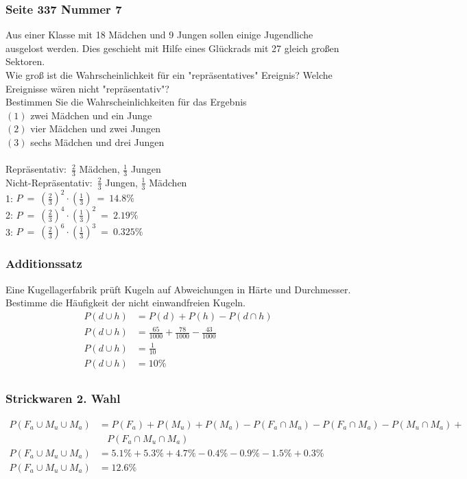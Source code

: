 \documentclass[a4paper,12pt]{article}
\begin{document}
\subsubsection*{Seite 337 Nummer 7}
Aus einer Klasse mit 18 Mädchen und 9 Jungen sollen einige Jugendliche ausgelost werden. Dies geschieht mit Hilfe eines Glückrads mit 27 gleich großen Sektoren.\\
Wie groß ist die Wahrscheinlichkeit für ein "repräsentatives" Ereignis? Welche Ereignisse wären nicht "repräsentativ"?\\
Bestimmen Sie die Wahrscheinlichkeiten für das Ergebnis\\
$(1)$ zwei Mädchen und ein Junge\\
$(2)$ vier Mädchen und zwei Jungen\\
$(3)$ sechs Mädchen und drei Jungen\\\\
Repräsentativ:\ $\frac{2}{3}$ Mädchen, $\frac{1}{3}$ Jungen\\
Nicht-Repräsentativ:\ $\frac{2}{3}$ Jungen, $\frac{1}{3}$ Mädchen\\
1: $P\ =\ (\frac{2}{3})^2 \cdot (\frac{1}{3})\ =\ 14.8\%$\\
2: $P\ =\ (\frac{2}{3})^4 \cdot (\frac{1}{3})^2\ =\ 2.19\%$\\
3: $P\ =\ (\frac{2}{3})^6 \cdot (\frac{1}{3})^3\ =\ 0.325\%$\\
\subsubsection*{Additionssatz}
Eine Kugellagerfabrik prüft Kugeln auf Abweichungen in Härte und Durchmesser.\\
Bestimme die Häufigkeit der nicht einwandfreien Kugeln. 
\begin{equation*}
\begin{split}
P(d \cup h) & = P(d) + P(h) - P(d \cap h)\\
P(d \cup h) & = \frac{65}{1000} + \frac{78}{1000} - \frac{43}{1000}\\
P(d \cup h) & = \frac{1}{10}\\
P(d \cup h) & = 10 \%\\
\end{split}
\end{equation*}
\subsubsection*{Strickwaren 2. Wahl}
\begin{equation*}
\begin{split}
P(F_a \cup M_u \cup M_a) & = P(F_a) + P(M_u) + P(M_a) - P(F_a \cap M_u) - P(F_a \cap M_a) - P(M_u \cap M_a) + \\
&\ \ \ \ P(F_a \cap M_u \cap M_a)\\
P(F_a \cup M_u \cup M_a) & = 5.1 \% + 5.3 \% + 4.7 \% - 0.4 \% - 0.9 \% - 1.5 \% + 0.3 \% \\
P(F_a \cup M_u \cup M_a) & = 12.6 \% \\
\end{split}
\end{equation*}
\end{document}
